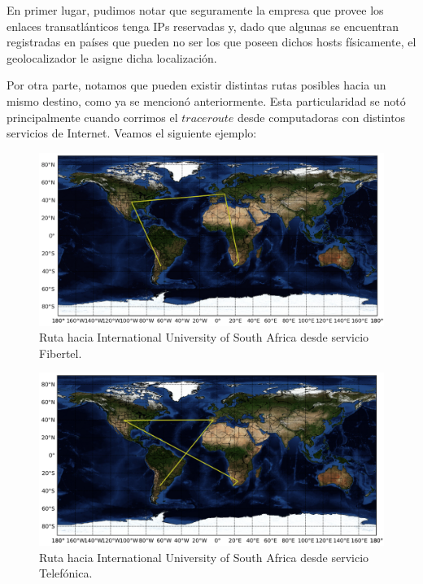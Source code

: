 \documentclass[10pt, a4paper]{article}
\begin{document}
En primer lugar, pudimos notar que seguramente la empresa que provee los enlaces transatlánticos tenga IPs reservadas y, dado que algunas se encuentran registradas en países que pueden no ser los que poseen dichos hosts físicamente, el geolocalizador le asigne dicha localización.

Por otra parte, notamos que pueden existir distintas rutas posibles hacia un mismo destino, como ya se mencionó anteriormente. Esta particularidad se notó principalmente cuando corrimos el $traceroute$ desde computadoras con distintos servicios de Internet. Veamos el siguiente ejemplo:

\begin{figure}[H] %
\begin{center}
\includegraphics[width=400pt]{../imgs/map-unisa.png}
\caption{Ruta hacia International University of South Africa desde servicio Fibertel.}
\end{center}
\end{figure}

\begin{figure}[H] %
\begin{center}
\includegraphics[width=400pt]{../imgs/map-unisa(telef).png}
\caption{Ruta hacia International University of South Africa desde servicio Telefónica.}
\end{center}
\end{figure}
\end{document}
